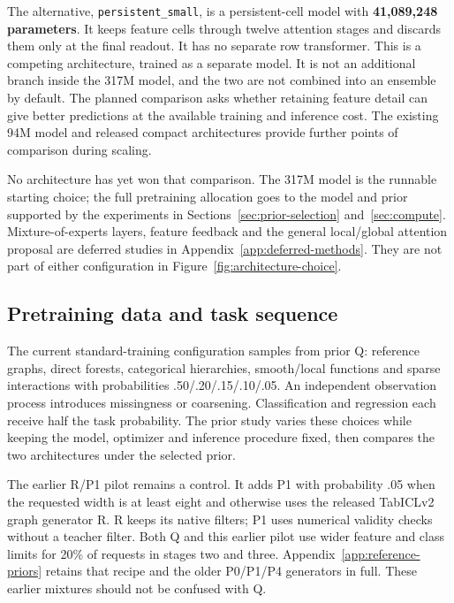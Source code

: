 \documentclass[11pt]{article}
\begin{document}
The alternative, \texttt{persistent\_small}, is a persistent-cell model with \textbf{41,089,248 parameters}. It keeps feature cells through twelve attention stages and discards them only at the final readout. It has no separate row transformer. This is a competing architecture, trained as a separate model. It is not an additional branch inside the 317M model, and the two are not combined into an ensemble by default. The planned comparison asks whether retaining feature detail can give better predictions at the available training and inference cost. The existing 94M model and released compact architectures provide further points of comparison during scaling.

No architecture has yet won that comparison. The 317M model is the runnable starting choice; the full pretraining allocation goes to the model and prior supported by the experiments in Sections~\ref{sec:prior-selection} and~\ref{sec:compute}. Mixture-of-experts layers, feature feedback and the general local/global attention proposal are deferred studies in Appendix~\ref{app:deferred-methods}. They are not part of either configuration in Figure~\ref{fig:architecture-choice}.

\subsection{Pretraining data and task sequence}

The current standard-training configuration samples from prior Q: reference graphs, direct forests, categorical hierarchies, smooth/local functions and sparse interactions with probabilities .50/.20/.15/.10/.05. An independent observation process introduces missingness or coarsening. Classification and regression each receive half the task probability. The prior study varies these choices while keeping the model, optimizer and inference procedure fixed, then compares the two architectures under the selected prior.

The earlier R/P1 pilot remains a control. It adds P1 with probability .05 when the requested width is at least eight and otherwise uses the released TabICLv2 graph generator R. R keeps its native filters; P1 uses numerical validity checks without a teacher filter. Both Q and this earlier pilot use wider feature and class limits for 20\% of requests in stages two and three. Appendix~\ref{app:reference-priors} retains that recipe and the older P0/P1/P4 generators in full. These earlier mixtures should not be confused with Q.
\end{document}
